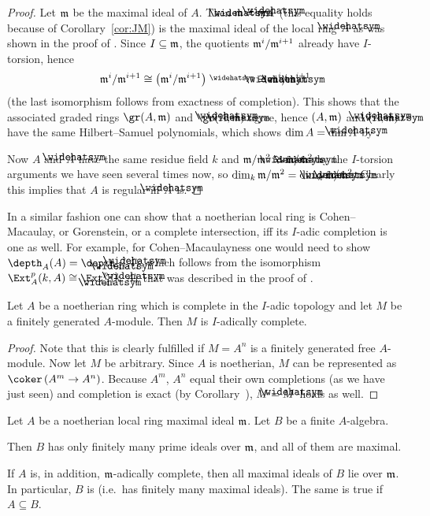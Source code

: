 \documentclass[a4paper,parskip=half,numbers=enddot, DIV=12]{scrreprt}
\begin{document}
\begin{proof}
	Let $\mathfrak{m}$ be the maximal ideal of $A$. Then $\roof{\mm}=\mm\roof{A}$ (this equality holds because of Corollary~\ref{cor:JM}) is the maximal ideal of the local ring $\roof{A}$ as was shown in the proof of \cite[Corollary~2.2.2]{homalg}. Since $I\subseteq \mathfrak{m}$, the quotients $\mathfrak{m}^i/\mathfrak{m}^{i+1}$ already have $I$-torsion, hence 
	\begin{align*}
		\mm^i/\mm^{i+1}\cong \left(\mm^i/\mm^{i+1}\right)^\complete\cong \roof{\mm}^i/\roof{\mm}^{i+1}
	\end{align*}
	(the last isomorphism follows from exactness of completion). This shows that the associated graded rings $\gr(A,\mm)$ and $\gr(\roof{A},\roof{\mm})$ agree, hence $(A,\mathfrak{m})$ and $(\roof{A},\roof{\mm})$ have the same Hilbert--Samuel polynomials, which shows $\dim A=\dim\roof{A}$ by \cite[Theorem~20]{alg2}.
	
	Now $A$ and $\roof{A}$ have the same residue field $k$ and $\mm/\mm^2\cong \roof{\mm}/\roof{\mm}^2$ by the $I$-torsion arguments we have seen several times now, so $\dim_k\mm/\mm^2=\dim_k\roof{\mm}/\roof{\mm}^2$. Clearly this implies that $A$ is regular iff $\roof{A}$ is.
\end{proof}
\begin{rem}
	In a similar fashion one can show that a noetherian local ring is Cohen--Macaulay, or Gorenstein, or a complete intersection, iff its $I$-adic completion is one as well. For example, for Cohen--Macaulayness one would need to show $\depth_A(A)=\depth_{\roof{A}}(\roof{A})$, which follows from the isomorphism $\Ext_A^p(k,A)\cong\Ext_{\roof{A}}^p(k,\roof{A})$ that was described in the proof of \cite[Proposition~2.4.2]{homalg}.
\end{rem}
\begin{prop}
	Let $A$ be a noetherian ring which is complete in the $I$-adic topology and let $M$ be a finitely generated $A$-module. Then $M$ is $I$-adically complete.
\end{prop}
\begin{proof}
	Note that this is clearly fulfilled if $M=A^n$ is a finitely generated free $A$-module. Now let $M$ be arbitrary. Since $A$ is noetherian, $M$ can be represented as $\coker\left(A^m\morphism A^n\right)$. Because $A^m$, $A^n$ equal their own completions (as we have just seen) and  completion is exact (by Corollary~), $M=\roof{M}$ holds as well.
\end{proof}
\begin{cor}
	Let $A$ be a noetherian local ring maximal ideal $\mathfrak{m}$. Let $B$ be a finite $A$-algebra.
	\begin{alphanumerate}
		\item Then $B$ has only finitely many prime ideals over $\mathfrak{m}$, and all of them are maximal.
		\item If $A$ is, in addition, $\mathfrak{m}$-adically complete, then all maximal ideals of $B$ lie over $\mathfrak{m}$. In particular, $B$ is  (i.e.\ has finitely many maximal ideals). The same is true if $A\subseteq B$.
	\end{alphanumerate}
\end{cor}
\end{document}
